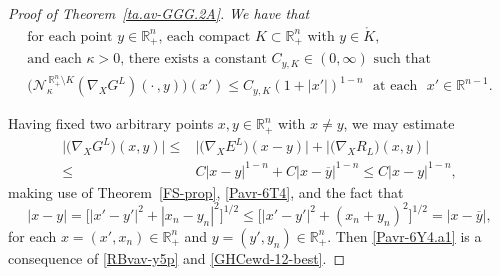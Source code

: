 \documentclass[11pt,reqno]{amsart}
\numberwithin{equation}{section}
\theoremstyle{remark}
\begin{document}
\begin{proof}[Proof of Theorem~\ref{ta.av-GGG.2A}]
\vskip 0.08in
 \textit{We have that
%
\begin{equation}\label{Pavr-6Y4.a1}
\begin{array}{c}
\text{for each point $y\in{\mathbb{R}}^n_{+}$, each compact $K\subset{\mathbb{R}}^n_{+}$ 
with $y\in\mathring{K}$,}
\\[4pt]
\text{and each $\kappa>0$, there exists a constant $C_{y,K}\in(0,\infty)$ such that}
\\[4pt]
\big({\mathcal{N}}_\kappa^{\,\mathbb{R}^{n}_{+}\setminus K}(\nabla_X G^L)(\cdot\,,y)\big)(x')\leq C_{y,K}(1+|x'|)^{1-n}
\,\,\text{ at each }\,\,x'\in{\mathbb{R}}^{n-1}.
\end{array}
\end{equation}
%
}
\vskip -0.05in

Having fixed two arbitrary points $x,y\in{\mathbb{R}}^n_{+}$ with $x\not=y$, we may estimate 
%
\begin{align}\label{RBvav-y5p}
\big|(\nabla_X G^L\big)(x,y)\big|\leq & \big|(\nabla_X E^L\big)(x-y)\big|
+\big|(\nabla_X R_L\big)(x,y)\big|
\nonumber\\[4pt]
\leq & C|x-y|^{1-n}+C|x-\overline{y}|^{1-n}\leq C|x-y|^{1-n},
\end{align}
%
making use of Theorem~\ref{FS-prop}, \eqref{Pavr-6T4}, and the fact that 
%
\begin{equation}\label{Ojhb}
|x-y|=\big[|x'-y'|^2+|x_n-y_n|^2\big]^{1/2}
\leq\big[|x'-y'|^2+(x_n+y_n)^2\big]^{1/2}=|x-\overline{y}|,
\end{equation}
%
for each $x=(x',x_n)\in{\mathbb{R}}^n_{+}$ and 
$y=(y',y_n)\in{\mathbb{R}}^n_{+}$. Then \eqref{Pavr-6Y4.a1} is a consequence 
of \eqref{RBvav-y5p} and \eqref{GHCewd-12-best}.


\end{proof}
\end{document}
